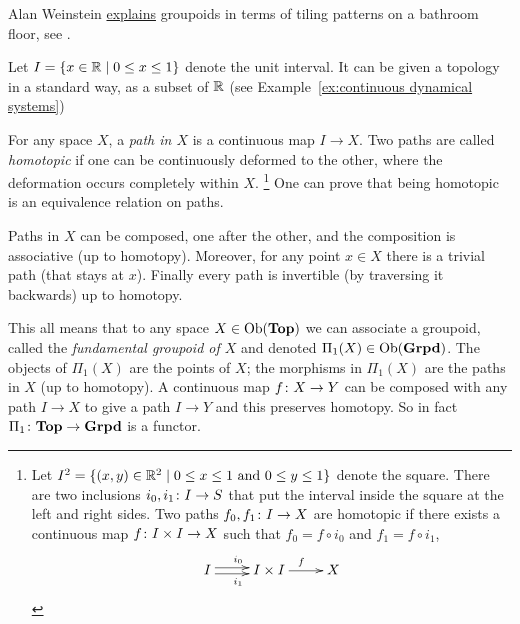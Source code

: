 \documentclass[CT4S-EN-RU]{subfiles}
\begin{document}
\begin{applicationRUS}
\end{applicationRUS}

\begin{exampleENG}
Alan Weinstein \href{http://www.ams.org/notices/199607/weinstein.pdf}{\text explains} groupoids in terms of tiling patterns on a bathroom floor, see \cite{WeA}.
\end{exampleENG}

\begin{exampleRUS}
\end{exampleRUS}

\begin{exampleENG}\label{ex:fundamental groupoid}
Let $I=\{x\in{\mathbb R}{\;|\;}0\leq x\leq 1\}$ denote the unit interval. It can be given a topology in a standard way, as a subset of ${\mathbb R}$ (see Example~\ref{ex:continuous dynamical systems})

For any space $X$, a {\em path in $X$} is a continuous map $I\to X$. Two paths are called {\em homotopic} if one can be continuously deformed to the other, where the deformation occurs completely within $X$.
\footnote{
Let $I^2=\{(x,y)\in{\mathbb R}^2{\;|\;}0\leq x\leq 1 \textnormal{ and } 0\leq y\leq 1\}$ denote the square. There are two inclusions $i_0,i_1\colon I\rightarrow S$ that put the interval inside the square at the left and right sides. Two paths $f_0,f_1\colon I\rightarrow X$ are homotopic if there exists a continuous map $f\colon I\times I\rightarrow X$ such that $f_0=f\circ i_0$ and $f_1=f\circ i_1$, 
$$\xymatrix{I\ar@<-.5ex>[r]_{i_1}\ar@<.5ex>[r]^{i_0}&I\times I\ar[r]^f&X}$$
} 
One can prove that being homotopic is an equivalence relation on paths. 

Paths in $X$ can be composed, one after the other, and the composition is associative (up to homotopy). Moreover, for any point $x\in X$ there is a trivial path (that stays at $x$). Finally every path is invertible (by traversing it backwards) up to homotopy. 

This all means that to any space $X\in\textnormal{Ob}({\mathbf{Top}})$ we can associate a groupoid, called the {\em fundamental groupoid of $X$} and denoted $\Pi_1(X)\in\textnormal{Ob}({\mathbf{Grpd}})$. The objects of $\Pi_1(X)$ are the points of $X$; the morphisms in $\Pi_1(X)$ are the paths in $X$ (up to homotopy). A continuous map $f\colon X\rightarrow Y$ can be composed with any path $I\to X$ to give a path $I\to Y$ and this preserves homotopy. So in fact $\Pi_1\colon{\mathbf{Top}}\rightarrow{\mathbf{Grpd}}$ is a functor.
\end{exampleENG}
\end{document}
